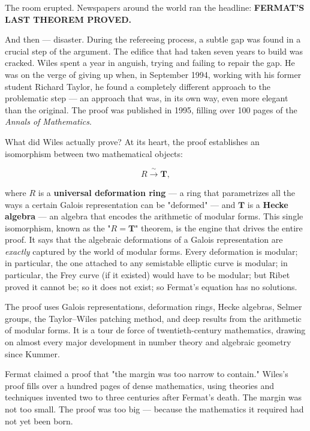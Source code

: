 The room erupted. Newspapers around the world ran the headline: \textbf{FERMAT'S LAST THEOREM PROVED.}

And then --- disaster. During the refereeing process, a subtle gap was found in a crucial step of the argument. The edifice that had taken seven years to build was cracked. Wiles spent a year in anguish, trying and failing to repair the gap. He was on the verge of giving up when, in September 1994, working with his former student Richard Taylor, he found a completely different approach to the problematic step --- an approach that was, in its own way, even more elegant than the original. The proof was published in 1995, filling over 100 pages of the \textit{Annals of Mathematics}.

What did Wiles actually prove? At its heart, the proof establishes an isomorphism between two mathematical objects:

\[R \xrightarrow{\;\sim\;} \mathbf{T},\]

where $R$ is a \textbf{universal deformation ring} --- a ring that parametrizes all the ways a certain Galois representation can be "deformed" --- and $\mathbf{T}$ is a \textbf{Hecke algebra} --- an algebra that encodes the arithmetic of modular forms. This single isomorphism, known as the "$R = \mathbf{T}$" theorem, is the engine that drives the entire proof. It says that the algebraic deformations of a Galois representation are \textit{exactly} captured by the world of modular forms. Every deformation is modular; in particular, the one attached to any semistable elliptic curve is modular; in particular, the Frey curve (if it existed) would have to be modular; but Ribet proved it cannot be; so it does not exist; so Fermat's equation has no solutions.

The proof uses Galois representations, deformation rings, Hecke algebras, Selmer groups, the Taylor--Wiles patching method, and deep results from the arithmetic of modular forms. It is a tour de force of twentieth-century mathematics, drawing on almost every major development in number theory and algebraic geometry since Kummer.



Fermat claimed a proof that "the margin was too narrow to contain." Wiles's proof fills over a hundred pages of dense mathematics, using theories and techniques invented two to three centuries after Fermat's death. The margin was not too small. The proof was too big --- because the mathematics it required had not yet been born.


